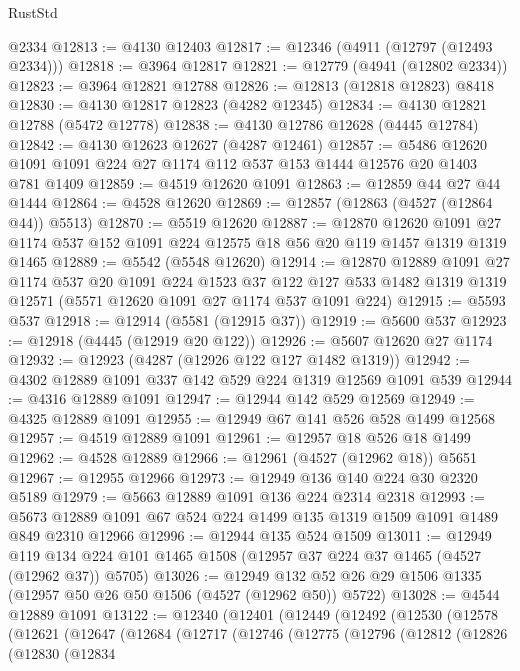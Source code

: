 \begin{lexlean}{RustStd}
\begin{coremodule}
    @2334
@12813 := @4130 @12403
@12817 := @12346 (@4911 (@12797 (@12493 @2334)))
@12818 := @3964 @12817
@12821 := @12779 (@4941 (@12802 @2334))
@12823 := @3964 @12821 @12788
@12826 := @12813 (@12818 @12823) @8418
@12830 := @4130 @12817 @12823 (@4282 @12345)
@12834 := @4130 @12821 @12788 (@5472 @12778)
@12838 := @4130 @12786 @12628 (@4445 @12784)
@12842 := @4130 @12623 @12627 (@4287 @12461)
@12857 := @5486 @12620 @1091 @1091 @224 @27 @1174 @112 @537 @153 @1444 @12576 @20 @1403 @781 @1409
@12859 := @4519 @12620 @1091
@12863 := @12859 @44 @27 @44 @1444
@12864 := @4528 @12620
@12869 := @12857 (@12863 (@4527 (@12864 @44)) @5513)
@12870 := @5519 @12620
@12887 := @12870
    @12620
    @1091
    @27
    @1174
    @537
    @152
    @1091
    @224
    @12575
    @18
    @56
    @20
    @119
    @1457
    @1319
    @1319
    @1465
@12889 := @5542 (@5548 @12620)
@12914 := @12870
    @12889
    @1091
    @27
    @1174
    @537
    @20
    @1091
    @224
    @1523
    @37
    @122
    @127
    @533
    @1482
    @1319
    @1319
    @12571
    (@5571 @12620 @1091 @27 @1174 @537 @1091 @224)
@12915 := @5593 @537
@12918 := @12914 (@5581 (@12915 @37))
@12919 := @5600 @537
@12923 := @12918 (@4445 (@12919 @20 @122))
@12926 := @5607 @12620 @27 @1174
@12932 := @12923 (@4287 (@12926 @122 @127 @1482 @1319))
@12942 := @4302 @12889 @1091 @337 @142 @529 @224 @1319 @12569 @1091 @539
@12944 := @4316 @12889 @1091
@12947 := @12944 @142 @529 @12569
@12949 := @4325 @12889 @1091
@12955 := @12949 @67 @141 @526 @528 @1499 @12568
@12957 := @4519 @12889 @1091
@12961 := @12957 @18 @526 @18 @1499
@12962 := @4528 @12889
@12966 := @12961 (@4527 (@12962 @18)) @5651
@12967 := @12955 @12966
@12973 := @12949 @136 @140 @224 @30 @2320 @5189
@12979 := @5663 @12889 @1091 @136 @224 @2314 @2318
@12993 := @5673 @12889 @1091 @67 @524 @224 @1499 @135 @1319 @1509 @1091 @1489 @849 @2310 @12966
@12996 := @12944 @135 @524 @1509
@13011 := @12949
    @119
    @134
    @224
    @101
    @1465
    @1508
    (@12957 @37 @224 @37 @1465 (@4527 (@12962 @37)) @5705)
@13026 := @12949 @132 @52 @26 @29 @1506 @1335 (@12957 @50 @26 @50 @1506 (@4527 (@12962 @50)) @5722)
@13028 := @4544 @12889 @1091
@13122 := @12340
    (@12401
      (@12449
        (@12492
          (@12530
            (@12578
              (@12621
                (@12647
                  (@12684
                    (@12717
                      (@12746
                        (@12775
                          (@12796
                            (@12812
                              (@12826
                                (@12830
                                  (@12834

\end{coremodule}
\end{lexlean}
